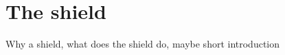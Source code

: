 \chapter{The shield}\label{cha:the-shield}

Why a shield, what does the shield do, maybe short introduction






